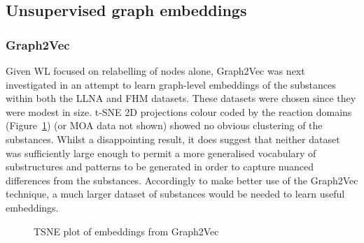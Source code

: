 \documentclass[
  super,
  preprint,
  3p]{elsarticle}
\begin{document}
\subsection{Unsupervised graph
embeddings}\label{unsupervised-graph-embeddings}

\subsubsection{Graph2Vec}\label{graph2vec}

Given WL focused on relabelling of nodes alone, Graph2Vec was next
investigated in an attempt to learn graph-level embeddings of the
substances within both the LLNA and FHM datasets. These datasets were
chosen since they were modest in size. t-SNE 2D projections
\citep{van_er_maaten_visualizing_2018} colour coded by the reaction
domains (Figure~\ref{fig-g2vllna}) (or MOA data not shown) showed no
obvious clustering of the substances. Whilst a disappointing result, it
does suggest that neither dataset was sufficiently large enough to
permit a more generalised vocabulary of substructures and patterns to be
generated in order to capture nuanced differences from the substances.
Accordingly to make better use of the Graph2Vec technique, a much larger
dataset of substances would be needed to learn useful embeddings.

\begin{figure}


\caption{\label{fig-g2vllna}TSNE plot of embeddings from Graph2Vec}

\end{figure}%
\end{document}
